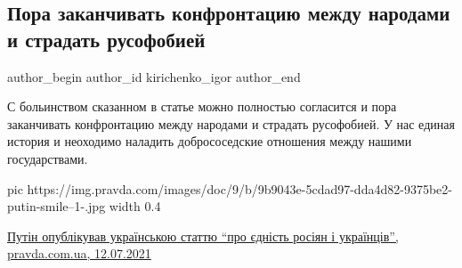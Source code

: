  
 
 
 
 
 
\subsection{Пора заканчивать конфронтацию между народами и страдать русофобией}
\label{sec:13_07_2021.fb.kirichenko_igor.1.narody_konfrontacia_okonchanie}
 
\ifcmt
 author_begin
   author_id kirichenko_igor
 author_end
\fi

С больинством  сказанном в статье можно полностью согласится и пора заканчивать
конфронтацию между народами и страдать русофобией. У нас единая история и
неоходимо наладить добрососедские отношения между нашими государствами.

\ifcmt
  pic https://img.pravda.com/images/doc/9/b/9b9043e-5cdad97-dda4d82-9375be2-putin-smile--1-.jpg
  width 0.4
\fi

\href{https://www.pravda.com.ua/news/2021/07/12/7300282/}{%
Путін опублікував українською статтю \enquote{про єдність росіян і українців}, pravda.com.ua, 12.07.2021%
}
